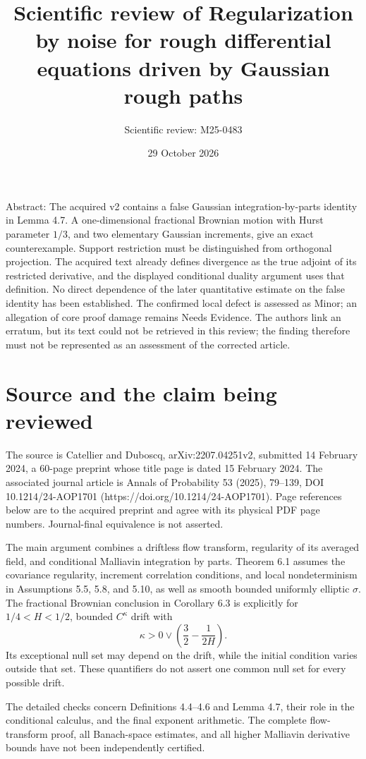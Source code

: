 \documentclass[10pt]{article}
\title{Scientific review of
Regularization by noise for rough differential equations driven by Gaussian rough paths}
\author{Scientific review: M25-0483}
\date{29 October 2026}
\begin{document}
\maketitle
Abstract: The acquired v2 contains a false Gaussian integration-by-parts identity in Lemma 4.7. A one-dimensional fractional Brownian motion with Hurst parameter \(1/3\), and two elementary Gaussian increments, give an exact counterexample. Support restriction must be distinguished from orthogonal projection. The acquired text already defines divergence as the true adjoint of its restricted derivative, and the displayed conditional duality argument uses that definition. No direct dependence of the later quantitative estimate on the false identity has been established. The confirmed local defect is assessed as Minor; an allegation of core proof damage remains Needs Evidence. The authors link an erratum, but its text could not be retrieved in this review; the finding therefore must not be represented as an assessment of the corrected article.\par
\section*{Source and the claim being reviewed}
The source is Catellier and Duboscq, arXiv:2207.04251v2, submitted 14 February 2024, a 60-page preprint whose title page is dated 15 February 2024. The associated journal article is Annals of Probability 53 (2025), 79–139, DOI 10.1214/24-AOP1701 (https://doi.org/10.1214/24-AOP1701). Page references below are to the acquired preprint and agree with its physical PDF page numbers. Journal-final equivalence is not asserted.\par
The main argument combines a driftless flow transform, regularity of its averaged field, and conditional Malliavin integration by parts. Theorem 6.1 assumes the covariance regularity, increment correlation conditions, and local nondeterminism in Assumptions 5.5, 5.8, and 5.10, as well as smooth bounded uniformly elliptic \(\sigma\). The fractional Brownian conclusion in Corollary 6.3 is explicitly for \(1/4<H<1/2\), bounded \(C^\kappa\) drift with \[\kappa>0\vee\left(\frac32-\frac1{2H}\right).\] Its exceptional null set may depend on the drift, while the initial condition varies outside that set. These quantifiers do not assert one common null set for every possible drift.\par
The detailed checks concern Definitions 4.4–4.6 and Lemma 4.7, their role in the conditional calculus, and the final exponent arithmetic. The complete flow-transform proof, all Banach-space estimates, and all higher Malliavin derivative bounds have not been independently certified.\par
\end{document}
